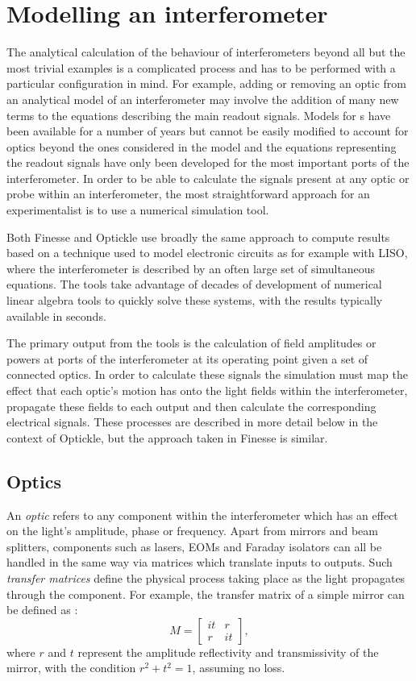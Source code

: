 \section{\label{sec:ifo-modelling}Modelling an interferometer}
The analytical calculation of the behaviour of interferometers beyond all but the most trivial examples is a complicated process and has to be performed with a particular configuration in mind. For example, adding or removing an optic from an analytical model of an interferometer may involve the addition of many new terms to the equations describing the main readout signals. Models for \DRFPMI{}s have been available for a number of years \cite{Strain2003, Mueller2003, Mason2003} but cannot be easily modified to account for optics beyond the ones considered in the model and the equations representing the readout signals have only been developed for the most important ports of the interferometer. In order to be able to calculate the signals present at any optic or probe within an interferometer, the most straightforward approach for an experimentalist is to use a numerical simulation tool.

Both Finesse and Optickle use broadly the same approach to compute results based on a technique used to model electronic circuits as for example with \gls{LISO}, where the interferometer is described by an often large set of simultaneous equations. The tools take advantage of decades of development of numerical linear algebra tools to quickly solve these systems, with the results typically available in seconds.

The primary output from the tools is the calculation of field amplitudes or powers at ports of the interferometer at its operating point given a set of connected optics. In order to calculate these signals the simulation must map the effect that each optic's motion has onto the light fields within the interferometer, propagate these fields to each output and then calculate the corresponding electrical signals. These processes are described in more detail below in the context of Optickle, but the approach taken in Finesse is similar.

\subsection{Optics}
An \emph{optic} refers to any component within the interferometer which has an effect on the light's amplitude, phase or frequency. Apart from mirrors and beam splitters, components such as lasers, \glspl{EOM} and Faraday isolators can all be handled in the same way via matrices which translate inputs to outputs. Such \emph{transfer matrices} define the physical process taking place as the light propagates through the component. For example, the transfer matrix of a simple mirror can be defined as \cite{Freise2010}:
\begin{equation}
  M =
  \begin{bmatrix}
    it & r \\
    r & it
  \end{bmatrix},
\end{equation}
where $r$ and $t$ represent the amplitude reflectivity and transmissivity of the mirror, with the condition $r^2 + t^2 = 1$, assuming no loss.

